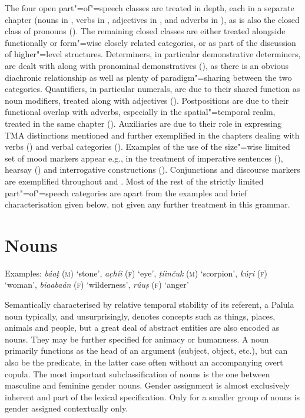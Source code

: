The four open part"=of"=speech classes are treated in depth, each in a separate chapter (nouns in , verbs in , adjectives in , and adverbs in ), as is also the closed class of pronouns (). The remaining closed classes are either treated alongside functionally or form"=wise closely related categories, or as part of the discussion of higher"=level structures. Determiners, in particular demonstrative determiners, are dealt with along with pronominal demonstratives (), as there is an obvious diachronic relationship as well as plenty of paradigm"=sharing between the two categories. Quantifiers, in particular numerals, are due to their shared function as noun modifiers, treated along with adjectives (). Postpositions are due to their functional overlap with adverbs, especially in the spatial"=temporal realm, treated in the same chapter (). Auxiliaries are due to their role in expressing TMA distinctions mentioned and further exemplified in the chapters dealing with verbs () and verbal categories (). Examples of the use of the size"=wise limited set of mood markers appear e.g., in the treatment of imperative sentences (), hearsay () and interrogative constructions (). Conjunctions and discourse markers are exemplified throughout  and . Most of the rest of the strictly limited part"=of"=speech categories are apart from the examples and brief characterisation given below, not given any further treatment in this grammar.


\section{Nouns}
\label{sec:3b-2}

\largerpage
Examples: \textit{báaṭ} (\textsc{m}) `stone', \textit{ac̣híi} (\textsc{f}) `eye', \textit{ṭíinčuk} (\textsc{m}) `scorpion', \textit{kúṛi} (\textsc{f}) `woman',  \textit{biaabaán} (\textsc{f}) `wilderness', \textit{rúuṣ} (\textsc{f}) `anger'


Semantically characterised by relative temporal stability of its referent, a Palula noun typically, and unsurprisingly, denotes concepts such as things, places, animals and people, but a great deal of abstract entities are also encoded as nouns. They may be further specified for animacy or humanness. A noun primarily functions as the head of an argument (subject, object, etc.), but can also be the predicate, in the latter case often without an accompanying overt copula. The most important subclassification of nouns is the one between masculine and feminine gender nouns. Gender assignment is almost exclusively inherent and part of the lexical specification. Only for a smaller group of nouns is gender assigned contextually only.


